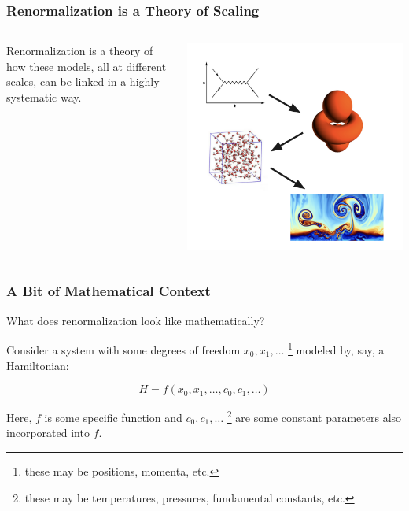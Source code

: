 \documentclass[aspectratio=169, 12pt]{beamer}
\begin{document}
\begin{frame}
    \frametitle{Renormalization is a Theory of Scaling}

    \begin{columns}
        
    \begin{column}{.6\textwidth}

        Renormalization is a theory of how these models, all at different scales, can be linked in a highly systematic way. 

    \end{column}
    \begin{column}{.4\textwidth}
        \includegraphics[width=\textwidth]{images/theory-flow.png}
    \end{column}
    \end{columns}
    
\end{frame}

\begin{frame}
    \frametitle{A Bit of Mathematical Context}
    
    What does renormalization look like mathematically?

    \vspace{1em}
    
    Consider a system with some degrees of freedom $x_0, x_1, \dots$ \footnote{these may be positions, momenta, etc.} modeled by, say, a Hamiltonian:
    
    \[H = f(x_0, x_1, \dots, c_0, c_1, \dots)\]
    
    Here, $f$ is some specific function and $c_0, c_1, \dots$ \footnote{these may be temperatures, pressures, fundamental constants, etc.} are some constant parameters also incorporated into $f$. 

\end{frame}
\end{document}
